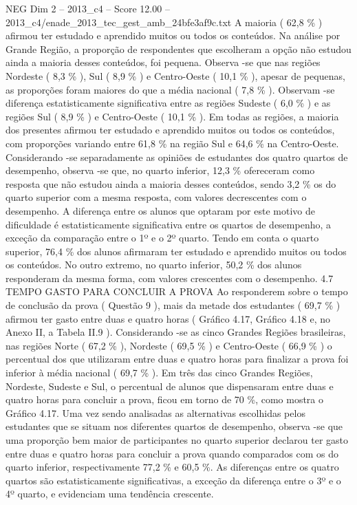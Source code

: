 \begin{textsample}{NEG Dim 2 – 2013\_c4 – Score 12.00 – 2013\_c4/enade\_2013\_tec\_gest\_amb\_24bfe3af9c.txt}
A maioria ( 62,8 \% ) afirmou ter estudado e aprendido muitos ou todos os conteúdos.
Na análise por Grande Região, a proporção de respondentes que escolheram a opção não estudou ainda a maioria desses conteúdos, foi pequena.
Observa -se que nas regiões Nordeste ( 8,3 \% ), Sul ( 8,9 \% ) e Centro-Oeste ( 10,1 \% ), apesar de pequenas, as proporções foram maiores do que a média nacional ( 7,8 \% ).
Observam -se diferença estatisticamente significativa entre as regiões Sudeste ( 6,0 \% ) e as regiões Sul ( 8,9 \% ) e Centro-Oeste ( 10,1 \% ).
Em todas as regiões, a maioria dos presentes afirmou ter estudado e aprendido muitos ou todos os conteúdos, com proporções variando entre 61,8 \% na região Sul e 64,6 \% na Centro-Oeste.
Considerando -se separadamente as opiniões de estudantes dos quatro quartos de desempenho, observa -se que, no quarto inferior, 12,3 \% ofereceram como resposta que não estudou ainda a maioria desses conteúdos, sendo 3,2 \% os do quarto superior com a mesma resposta, com valores decrescentes com o desempenho.
A diferença entre os alunos que optaram por este motivo de dificuldade é estatisticamente significativa entre os quartos de desempenho, a exceção da comparação entre o 1º e o 2º quarto.
Tendo em conta o quarto superior, 76,4 \% dos alunos afirmaram ter estudado e aprendido muitos ou todos os conteúdos.
No outro extremo, no quarto inferior, 50,2 \% dos alunos responderam da mesma forma, com valores crescentes com o desempenho. 4.7 TEMPO GASTO PARA CONCLUIR A PROVA Ao responderem sobre o tempo de conclusão da prova ( Questão 9 ), mais da metade dos estudantes ( 69,7 \% ) afirmou ter gasto entre duas e quatro horas ( Gráfico 4.17, Gráfico 4.18 e, no Anexo II, a Tabela II.9 ).
Considerando -se as cinco Grandes Regiões brasileiras, nas regiões Norte ( 67,2 \% ), Nordeste ( 69,5 \% ) e Centro-Oeste ( 66,9 \% ) o percentual dos que utilizaram entre duas e quatro horas para finalizar a prova foi inferior à média nacional ( 69,7 \% ).
Em três das cinco Grandes Regiões, Nordeste, Sudeste e Sul, o percentual de alunos que dispensaram entre duas e quatro horas para concluir a prova, ficou em torno de 70 \%, como mostra o Gráfico 4.17.
Uma vez sendo analisadas as alternativas escolhidas pelos estudantes que se situam nos diferentes quartos de desempenho, observa -se que uma proporção bem maior de participantes no quarto superior declarou ter gasto entre duas e quatro horas para concluir a prova quando comparados com os do quarto inferior, respectivamente 77,2 \% e 60,5 \%.
As diferenças entre os quatro quartos são estatisticamente significativas, a exceção da diferença entre o 3º e o 4º quarto, e evidenciam uma tendência crescente.

\end{textsample}
